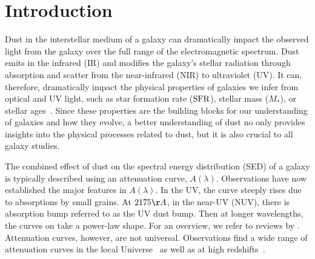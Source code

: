 \section{Introduction} \label{sec:intro} 
Dust in the interstellar medium of a galaxy can dramatically impact the
observed light from the galaxy over the full range of the electromagnetic spectrum. 
Dust emits in the infrared (IR) and modifies the galaxy's stellar radiation
through absorption and scatter from the near-infrared (NIR) to ultraviolet
(UV). It can, therefore, dramatically impact the physical properties of
galaxies we infer from optical and UV light, such as star
formation rate (${\rm SFR}$), stellar mass ($M_*$), or stellar ages~\citep[see
reviews by][]{walcher2011, conroy2013}. Since these properties are the
building blocks for our understanding of galaxies and how they evolve,
a better understanding of dust no only provides insights into the physical
processes related to dust, but it is also crucial to all galaxy studies.  


The combined effect of dust on the spectral energy distribution (SED) of a
galaxy is typically described using an attenuation curve, $A(\lambda)$.
Observations have now established the major features in $A(\lambda)$. In the UV, the 
curve steeply rises due to absorptions by small grains. At $2175\AA$, in the 
near-UV (NUV), there is absorption bump referred to as the UV dust bump. Then 
at longer wavelengths, the curves on take a power-law shape. For an overview, we 
refer to reviews by \cite{calzetti2001, draine2003, galliano2018}. Attenuation
curves, however, are not universal. Observations find a wide range of
attenuation curves in the local Universe~\citep{wild2011, battisti2017,
salim2018, salim2020} as well as at high redshifts~\citep[\eg][]{reddy2015,
salmon2016}. %

